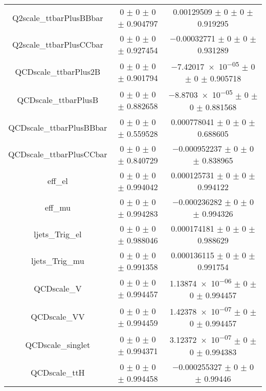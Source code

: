 \begin{table}
\begin{tabular}{ccc}
Q2scale\_ttbarPlusBBbar & \num{0} $\pm$ \num{0} $\pm$ \num{0} $\pm$ \num{0.904797} & \num{0.00129509} $\pm$ \num{0} $\pm$ \num{0} $\pm$ \num{0.919295}\\
Q2scale\_ttbarPlusCCbar & \num{0} $\pm$ \num{0} $\pm$ \num{0} $\pm$ \num{0.927454} & \num{-0.00032771} $\pm$ \num{0} $\pm$ \num{0} $\pm$ \num{0.931289}\\
QCDscale\_ttbarPlus2B & \num{0} $\pm$ \num{0} $\pm$ \num{0} $\pm$ \num{0.901794} & \num{-7.42017e-05} $\pm$ \num{0} $\pm$ \num{0} $\pm$ \num{0.905718}\\
QCDscale\_ttbarPlusB & \num{0} $\pm$ \num{0} $\pm$ \num{0} $\pm$ \num{0.882658} & \num{-8.8703e-05} $\pm$ \num{0} $\pm$ \num{0} $\pm$ \num{0.881568}\\
QCDscale\_ttbarPlusBBbar & \num{0} $\pm$ \num{0} $\pm$ \num{0} $\pm$ \num{0.559528} & \num{0.000778041} $\pm$ \num{0} $\pm$ \num{0} $\pm$ \num{0.688605}\\
QCDscale\_ttbarPlusCCbar & \num{0} $\pm$ \num{0} $\pm$ \num{0} $\pm$ \num{0.840729} & \num{-0.000952237} $\pm$ \num{0} $\pm$ \num{0} $\pm$ \num{0.838965}\\
eff\_el & \num{0} $\pm$ \num{0} $\pm$ \num{0} $\pm$ \num{0.994042} & \num{0.000125731} $\pm$ \num{0} $\pm$ \num{0} $\pm$ \num{0.994122}\\
eff\_mu & \num{0} $\pm$ \num{0} $\pm$ \num{0} $\pm$ \num{0.994283} & \num{-0.000236282} $\pm$ \num{0} $\pm$ \num{0} $\pm$ \num{0.994326}\\
ljets\_Trig\_el & \num{0} $\pm$ \num{0} $\pm$ \num{0} $\pm$ \num{0.988046} & \num{0.000174181} $\pm$ \num{0} $\pm$ \num{0} $\pm$ \num{0.988629}\\
ljets\_Trig\_mu & \num{0} $\pm$ \num{0} $\pm$ \num{0} $\pm$ \num{0.991358} & \num{0.000136115} $\pm$ \num{0} $\pm$ \num{0} $\pm$ \num{0.991754}\\
QCDscale\_V & \num{0} $\pm$ \num{0} $\pm$ \num{0} $\pm$ \num{0.994457} & \num{1.13874e-06} $\pm$ \num{0} $\pm$ \num{0} $\pm$ \num{0.994457}\\
QCDscale\_VV & \num{0} $\pm$ \num{0} $\pm$ \num{0} $\pm$ \num{0.994459} & \num{1.42378e-07} $\pm$ \num{0} $\pm$ \num{0} $\pm$ \num{0.994457}\\
QCDscale\_singlet & \num{0} $\pm$ \num{0} $\pm$ \num{0} $\pm$ \num{0.994371} & \num{3.12372e-07} $\pm$ \num{0} $\pm$ \num{0} $\pm$ \num{0.994383}\\
QCDscale\_ttH & \num{0} $\pm$ \num{0} $\pm$ \num{0} $\pm$ \num{0.994458} & \num{-0.000255327} $\pm$ \num{0} $\pm$ \num{0} $\pm$ \num{0.99446}\\

\end{tabular}
\end{table}
